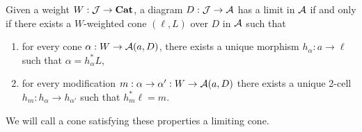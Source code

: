 \documentclass[../thesis.tex]{subfiles}
\begin{document}
\begin{proposition}\label{prop:chr of 2-limits}
  Given a weight $W : {\mathcal{J}} \to {\mathbf{Cat}}$, a diagram $D : {\mathcal{J}} \to {\mathcal{A}}$ has a limit in ${\mathcal{A}}$ if and only if there
  exists a $W$-weighted cone $(\ell,L)$ over $D$ in ${\mathcal{A}}$ such that
  \begin{enumerate}
    \item for every cone $\alpha : W \to {\mathcal{A}}(a,D)$, there exists a unique morphism $h_\alpha : a \to
      \ell$ such that $\alpha = h_\alpha^*L$,
    \item for every modification $m : \alpha \to \alpha' : W \to {\mathcal{A}}(a,D)$ there exists a unique 2-cell
      $h_m : h_\alpha \to h_{\alpha'}$ such that $h_m^*\ell = m$.
  \end{enumerate}
  We will call a cone satisfying these properties a limiting cone.
\end{proposition}
\end{document}

